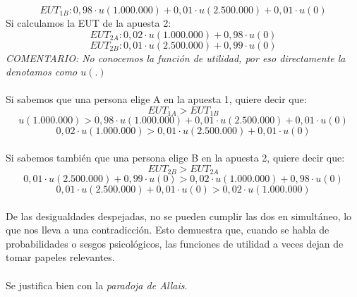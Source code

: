\documentclass{article}
\begin{document}
        \[EUT_{1B}:0,98 \cdot u(1.000.000) + 0,01 \cdot u(2.500.000) + 0,01 \cdot u(0)\]
        Si calculamos la EUT de la apuesta 2:
        \[EUT_{2A}: 0,02 \cdot u(1.000.000) + 0,98 \cdot u(0)\]
        \[EUT_{2B}: 0,01 \cdot u(2.500.000) + 0,99 \cdot u(0)\]
        \textit{COMENTARIO: No conocemos la función de utilidad, por eso directamente la denotamos como $u(.)$}
        \\
        \\
        Si sabemos que una persona elige A en la apuesta 1, quiere decir que:
        \[EUT_{1A} > EUT_{1B}\]
        \[u(1.000.000) > 0,98 \cdot u(1.000.000) + 0,01 \cdot u(2.500.000) + 0,01 \cdot u(0)\]
        \[0,02 \cdot u(1.000.000) > 0,01 \cdot u(2.500.000) + 0,01 \cdot u(0)\]
        \\
        Si sabemos también que una persona elige B en la apuesta 2, quiere decir que:
        \[EUT_{2B} > EUT_{2A}\]
        \[0,01 \cdot u(2.500.000) + 0,99 \cdot u(0) > 0,02 \cdot u(1.000.000) + 0,98 \cdot u(0)\]
        \[0,01 \cdot u(2.500.000) + 0,01 \cdot u(0) > 0,02 \cdot u(1.000.000)\]
        \\
        De las desigualdades despejadas, no se pueden cumplir las dos en simultáneo, lo que nos lleva a una contradicción. Esto demuestra que, cuando se habla de probabilidades o sesgos psicológicos, las funciones de utilidad a veces dejan de tomar papeles relevantes.
        \\
        \\
        Se justifica bien con la \emph{paradoja de Allais}.
\end{document}
